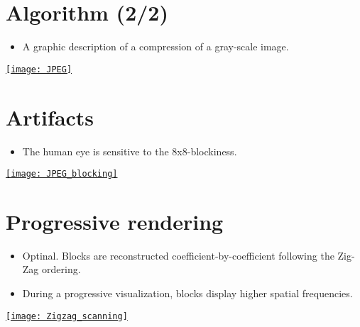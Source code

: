 \section*{Algorithm (2/2)}
\begin{itemize}
\item A graphic description of a compression of a gray-scale image.
\end{itemize}
\vspace{-2ex}
\begin{center}
  \href{https://link.springer.com/article/10.1007/s40799-019-00358-4}{\texttt{[image: JPEG]}}
\end{center}

\section{Artifacts}
\begin{itemize}
\item The human eye is sensitive to the 8x8-blockiness.
\end{itemize}
\vspace{-2ex}
\begin{center}
  \href{https://thesai.org/Publications/ViewPaper?Volume=6&Issue=4&Code=ijacsa&SerialNo=16}{\texttt{[image: JPEG\_blocking]}}
\end{center}

\section{Progressive rendering}
\begin{itemize}
\item Optinal. Blocks are reconstructed coefficient-by-coefficient following the Zig-Zag ordering.
\item During a progressive visualization, blocks display higher
  spatial frequencies.
\end{itemize}
\begin{center}
  \href{https://es.m.wikipedia.org/wiki/Archivo:Zigzag_scanning.jpg}{\texttt{[image: Zigzag\_scanning]}}
\end{center}

